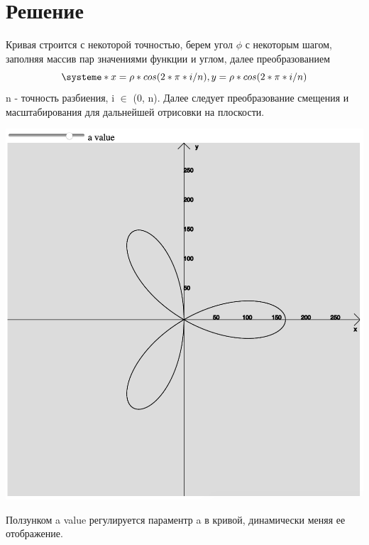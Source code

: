 \section{Решение}
Кривая строится с некоторой точностью, берем угол $\phi$ с некоторым шагом, заполняя массив пар значениями функции и углом, далее преобразованием
\[
\systeme*{x = \rho * cos(2 * \pi * i / n), y = \rho * cos(2 * \pi * i / n)}
\]
n - точность разбиения, i $\in$ (0, n). Далее следует преобразование смещения и масштабирования для дальнейшей отрисовки на плоскости.

\includegraphics[scale=0.5]{pictures/1.png}

Ползунком a value регулируется параментр a в кривой, динамически меняя ее отображение.








